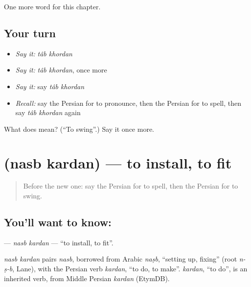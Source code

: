\begin{grammarlens}[title={What you've built}]
One more word for this chapter.
\end{grammarlens}

\subsection*{Your turn}
\begin{itemize}
\raggedright
  \item \emph{Say it:} \emph{tâb khordan}
  \item \emph{Say it:} \emph{tâb khordan}, once more
  \item \emph{Say it:} say \emph{tâb khordan}
  \item \emph{Recall:} say the Persian for to pronounce, then the Persian for to spell, then say \emph{tâb khordan} again
\end{itemize}

\begin{tcolorbox}[breakable,colback=teal!4,colframe=teal!35!black,title={Before you move on}]
What does   mean? (\textquotedblleft{}To swing\textquotedblright{}.) Say it once more.
\end{tcolorbox}
\section[\texorpdfstring{\fa{نصب} \fa{کردن} (nasb kardan)}{نصب کردن (nasb kardan)}]{  (nasb kardan) — to install, to fit}

\label{lesson:FA-C188-nasb-kardan}



\begin{quote}
Before the new one: say the Persian for to spell, then the Persian for to swing.
\end{quote}

\subsection*{You'll want to know:  }
\textbf{ } — \emph{nasb kardan} — \textquotedblleft{}to install, to fit\textquotedblright{}.

\begin{cousinweb}
\emph{nasb kardan} pairs \emph{nasb}, borrowed from Arabic \emph{naṣb}, \textquotedblleft{}setting up, fixing\textquotedblright{} (root \emph{n-ṣ-b}, Lane), with the Persian verb \emph{kardan}, \textquotedblleft{}to do, to make\textquotedblright{}. \emph{kardan}, \textquotedblleft{}to do\textquotedblright{}, is an inherited verb, from Middle Persian \emph{kardan} (EtymDB).
\end{cousinweb}

